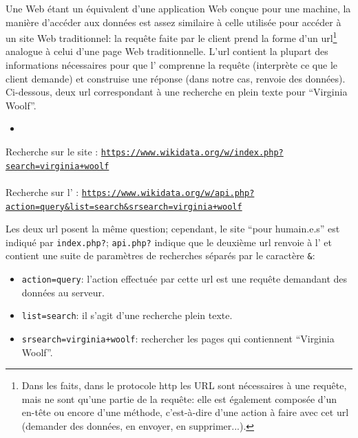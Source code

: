Une \api{} Web étant un équivalent d'une application Web conçue pour une machine, la manière d'accéder aux données est assez similaire à celle utilisée pour accéder à un site Web traditionnel: la requête faite par le client prend la forme d'un \gls{url}\footnote{Dans les faits, dans le protocole \gls{http} les URL sont nécessaires à une requête, mais ne sont qu'une partie de la requête: elle est également composée d'un en-tête ou encore d'une méthode, c'est-à-dire d'une action à faire avec cet \gls{url} (demander des données, en envoyer, en supprimer...).} analogue à celui d'une page Web traditionnelle. L'\gls{url} contient la plupart des informations nécessaires pour que l'\api{} comprenne la requête (interprète ce que le client demande) et construise une réponse (dans notre cas, renvoie des données). Ci-dessous, deux \gls{url} correspondant à une recherche en plein texte pour \enquote{Virginia Woolf}.
\begin{itemize}
	\item 
\end{itemize}

\begin{center}
	Recherche sur le site \wkd{}: \texttt{\url{https://www.wikidata.org/w/index.php?search=virginia+woolf}}
	\\~\\
	Recherche sur l'\api{} \wkd{}: \texttt{\url{https://www.wikidata.org/w/api.php?action=query&list=search&srsearch=virginia+woolf}}
\end{center}

Les deux \gls{url} posent la même question; cependant, le site \enquote{pour humain.e.s} est indiqué par \texttt{index.php?}; \texttt{api.php?} indique que le deuxième \gls{url} renvoie à l'\api{} et contient une suite de paramètres de recherches séparés par le caractère \texttt{\&}:
\begin{itemize}
	\item \texttt{action=query}: l'action effectuée par cette \gls{url} est une requête demandant des données au serveur.
	\item \texttt{list=search}: il s'agit d'une recherche plein texte.
	\item \texttt{srsearch=virginia+woolf}: rechercher les pages qui contiennent \enquote{Virginia Woolf}.
\end{itemize}

